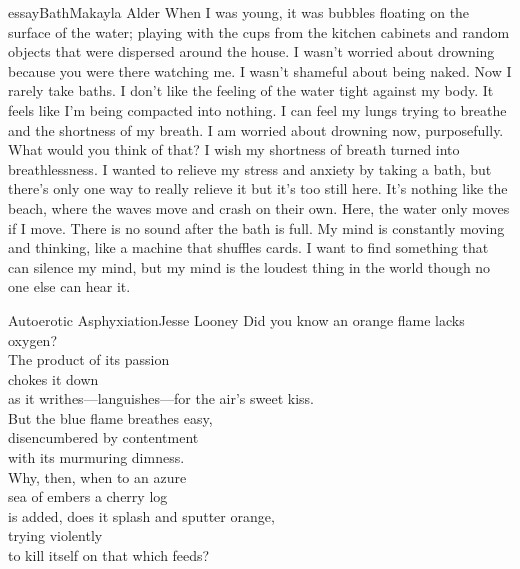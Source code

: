 \begin{prose}{essay}{Bath}{Makayla Alder}
When I was young, it was bubbles floating on the surface of the water; playing with the cups from the kitchen cabinets and random objects that were dispersed around the house. I wasn't worried about drowning because you were there watching me. I wasn't shameful about being naked. Now I rarely take baths. I don't like the feeling of the water tight against my body. It feels like I'm being compacted into nothing. I can feel my lungs trying to breathe and the shortness of my breath. I am worried about drowning now, purposefully. What would you think of that? I wish my shortness of breath turned into breathlessness. I wanted to relieve my stress and anxiety by taking a bath, but there's only one way to really relieve it but it's too still here. It's nothing like the beach, where the waves move and crash on their own. Here, the water only moves if I move. There is no sound after the bath is full. My mind is constantly moving and thinking, like a machine that shuffles cards. I want to find something that can silence my mind, but my mind is the loudest thing in the world though no one else can hear it.
\end{prose}

\begin{poetry}{Autoerotic Asphyxiation}{Jesse Looney}
Did you know an orange flame lacks oxygen?\\
The product of its passion\\
chokes it down\\
as it writhes---languishes---for the air's sweet kiss.\\
But the blue flame breathes easy,\\
disencumbered by contentment\\
with its murmuring dimness.\\
Why, then, when to an azure\\
sea of embers a cherry log\\
is added, does it splash and sputter orange,\\
trying violently\\
to kill itself on that which feeds?
\end{poetry}


